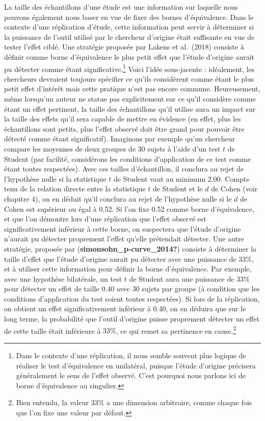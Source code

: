 \documentclass[
  english,
  man]{apa6}
\begin{document}
La taille des échantillons d'une étude est une information sur laquelle nous pouvons également nous baser en vue de fixer des bornes d'équivalence. Dans le contexte d'une réplication d'étude, cette information peut servir à déterminer si la puissance de l'outil utilisé par le chercheur d'origine était suffisante en vue de tester l'effet ciblé. Une stratégie proposée par Lakens et al.~(2018) consiste à définir comme borne d'équivalence le plus petit effet que l'étude d'origine aurait pu détecter comme étant significative.\footnote{Dans le contexte d'une réplication, il nous semble souvent plus logique de réaliser le test d'équivalence en unilatéral, puisque l'étude d'origine précisera généralement le sens de l'effet observé. C'est pourquoi nous parlons ici de borne d'équivalence au singulier.} Voici l'idée sous-jacente : idéalement, les chercheurs devraient toujours spécifier ce qu'ils considèrent comme étant le plus petit effet d'intérêt mais cette pratique n'est pas encore commune. Heureusement, même lorsqu'un auteur ne statue pas explicitement sur ce qu'il considère comme étant un effet pertinent, la taille des échantillons qu'il utilise aura un impact sur la taille des effets qu'il sera capable de mettre en évidence (en effet, plus les échantillons sont petits, plus l'effet observé doit être grand pour pouvoir être détecté comme étant significatif). Imaginons par exemple qu'un chercheur compare les moyennes de deux groupes de 30 sujets à l'aide d'un test \(t\) de Student (par facilité, considérons les conditions d'application de ce test comme étant toutes respectées). Avec ces tailles d'échantillon, il conclura au rejet de l'hypothèse nulle si la statistique \(t\) de Student vaut au minimum 2.00. Compte tenu de la relation directe entre la statistique \(t\) de Student et le \(d\) de Cohen (voir chapitre 4), on en déduit qu'il conclura au rejet de l'hypothèse nulle si le \(d\) de Cohen est supérieur ou égal à 0.52. Si l'on fixe 0.52 comme borne d'équivalence, et que l'on démontre lors d'une réplication que l'effet observé est significativement inférieur à cette borne, on suspectera que l'étude d'origine n'aurait pu détecter proprement l'effet qu'elle prétendait détecter. Une autre stratégie, proposée par (\textbf{simonsohn\_p-curve\_2014?}) consiste à déterminer la taille d'effet que l'étude d'origine aurait pu détecter avec une puissance de \(33\%\), et à utiliser cette information pour définir la borne d'équivalence. Par exemple, avec une hypothèse bilatérale, un test \(t\) de Student aura une puissance de \(33\%\) pour détecter un effet de taille 0.40 avec 30 sujets par groupe (à condition que les conditions d'application du test soient toutes respectées). Si lors de la réplication, on obtient un effet significativement inférieur à 0.40, on en déduira que sur le long terme, la probabilité que l'outil d'origine puisse proprement détecter un effet de cette taille était inférieure à \(33\%\), ce qui remet sa pertinence en cause.\footnote{Bien entendu, la valeur $33\%$ a une dimension arbitraire, comme chaque fois que l'on fixe une valeur par défaut.}
\end{document}
